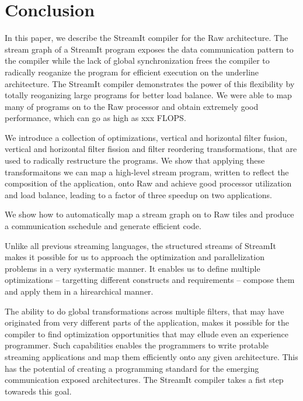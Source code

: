 \section{Conclusion}
\label{sec:conclusion}

In this paper, we describe the StreamIt compiler for the Raw
architecture.  The stream graph of a StreamIt program exposes the data
communication pattern to the compiler while the lack of global
synchronization frees the compiler to radically reoganize the program
for efficient execution on the underline architecture. The StreamIt
compiler demonstrates the power of this flexibility by totally
reoganizing large programs for better load balance. We were able to
map many of programs on to the Raw processor and obtain extremely good
performance, which can go as high as xxx FLOPS.

We introduce a collection of optimizations, vertical and horizontal
filter fusion, vertical and horizontal filter fission and filter
reordering transformations, that are used to radically restructure the
programs.  We show that applying these transformaitons we can map a
high-level stream program, written to reflect the composition of the
application, onto Raw and achieve good processor utilization and load
balance, leading to a factor of three speedup on two applications.

We show how to automatically map a stream graph on to Raw tiles and
produce a communication sschedule and generate efficient code.

Unlike all previous streaming languages, the structured streams of
StreamIt makes it possible for us to approach the optimization and
parallelization problems in a very systermatic manner. It enables us
to define multiple optimizations -- targetting different constructs
and requirements -- compose them and apply them in a hirearchical
manner.

The ability to do global transformations across multiple filters, that
may have originated from very different parts of the application,
makes it possible for the compiler to find optimization opportunities
that may ellude even an experience programmer.  Such capabilities
enables the programmers to write protable streaming applications and
map them efficiently onto any given architecture. This has the
potential of creating a programming standard for the emerging
communication exposed architectures. The StreamIt compiler takes a
fist step towareds this goal.

